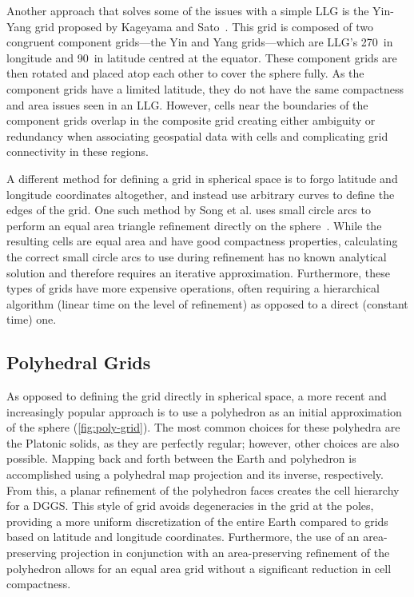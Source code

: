 Another approach that solves some of the issues with a simple LLG is the Yin-Yang grid proposed by Kageyama and Sato~\cite{kageyama2004yin-yang}.
This grid is composed of two congruent component grids---the Yin and Yang grids---which are LLG's 270\textdegree \ in longitude and 90\textdegree \ in latitude centred at the equator.
These component grids are then rotated and placed atop each other to cover the sphere fully.
As the component grids have a limited latitude, they do not have the same compactness and area issues seen in an LLG.
However, cells near the boundaries of the component grids overlap in the composite grid creating either ambiguity or redundancy when associating geospatial data with cells and complicating grid connectivity in these regions.


A different method for defining a grid in spherical space is to forgo latitude and longitude coordinates altogether, and instead use arbitrary curves to define the edges of the grid.
One such method by Song et al. uses small circle arcs to perform an equal area triangle refinement directly on the sphere~\cite{song2002developing}.
While the resulting cells are equal area and have good compactness properties, calculating the correct small circle arcs to use during refinement has no known analytical solution and therefore requires an iterative approximation.
Furthermore, these types of grids have more expensive operations, often requiring a hierarchical algorithm (linear time on the level of refinement) as opposed to a direct (constant time) one.


\subsection{Polyhedral Grids} \label{chap:2:polyhedral}
As opposed to defining the grid directly in spherical space, a more recent and increasingly popular approach is to use a polyhedron as an initial approximation of the sphere (\cref{fig:poly-grid}).
The most common choices for these polyhedra are the Platonic solids, as they are perfectly regular; however, other choices are also possible.
Mapping back and forth between the Earth and polyhedron is accomplished using a polyhedral map projection and its inverse, respectively.
From this, a planar refinement of the polyhedron faces creates the cell hierarchy for a DGGS.
This style of grid avoids degeneracies in the grid at the poles, providing a more uniform discretization of the entire Earth compared to grids based on latitude and longitude coordinates.
Furthermore, the use of an area-preserving projection in conjunction with an area-preserving refinement of the polyhedron allows for an equal area grid without a significant reduction in cell compactness.



